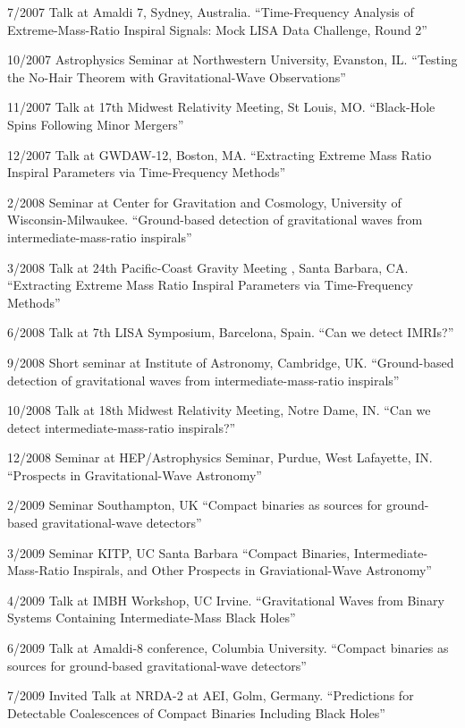 \documentclass[margin,line]{res}
\begin{document}
\begin{resume}
7/2007 	Talk 	at Amaldi 7, Sydney, Australia. 	``Time-Frequency Analysis of Extreme-Mass-Ratio Inspiral Signals: Mock LISA Data Challenge, Round 2''

10/2007 	Astrophysics Seminar at Northwestern University, Evanston, IL. 	``Testing the No-Hair Theorem with Gravitational-Wave Observations''

11/2007 	Talk 	at 17th Midwest Relativity Meeting, St Louis, MO. 	``Black-Hole Spins Following Minor Mergers''

12/2007 	Talk 	at GWDAW-12, Boston, MA. 	``Extracting Extreme Mass Ratio Inspiral Parameters via Time-Frequency Methods''

2/2008 	Seminar at Center for Gravitation and Cosmology, University of Wisconsin-Milwaukee. 	``Ground-based detection of gravitational waves from intermediate-mass-ratio inspirals''

3/2008 	Talk at 24th Pacific-Coast Gravity Meeting , Santa Barbara, CA. 	``Extracting Extreme Mass Ratio Inspiral Parameters via Time-Frequency Methods''

6/2008 	Talk at 7th LISA Symposium, Barcelona, Spain. 	``Can we detect IMRIs?''

9/2008 	Short seminar  at Institute of Astronomy, Cambridge, UK. 	``Ground-based detection of gravitational waves from intermediate-mass-ratio inspirals'' 

10/2008 	Talk 	at 18th Midwest Relativity Meeting, Notre Dame, IN. 	``Can we detect intermediate-mass-ratio inspirals?''

12/2008 	Seminar at HEP/Astrophysics Seminar, Purdue, West Lafayette, IN. 	``Prospects in Gravitational-Wave Astronomy'' 


2/2009 	Seminar 	Southampton, UK 	``Compact binaries as sources for ground-based gravitational-wave detectors''

3/2009 	Seminar 	KITP, UC Santa Barbara 	``Compact Binaries, Intermediate-Mass-Ratio Inspirals, and Other Prospects in Graviational-Wave Astronomy''

4/2009 	Talk 	at IMBH Workshop, UC Irvine. 	``Gravitational Waves from Binary Systems Containing Intermediate-Mass Black Holes'' 

6/2009	Talk at Amaldi-8 conference, Columbia University. ``Compact binaries as sources for ground-based gravitational-wave detectors''

7/2009	Invited Talk at NRDA-2 at AEI, Golm, Germany. ``Predictions for Detectable Coalescences of Compact Binaries Including Black Holes''


\end{resume}
\end{document}
